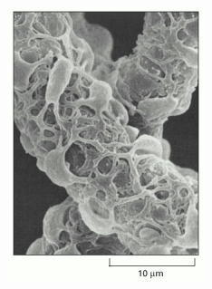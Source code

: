 \begin{figure}[h!]
\begin{minipage}{0.4\textwidth}
		\includegraphics[width=\textwidth]{images/perycitesForVascular.jpg}
	\end{minipage}
\end{figure}
\vspace{-15pt}
